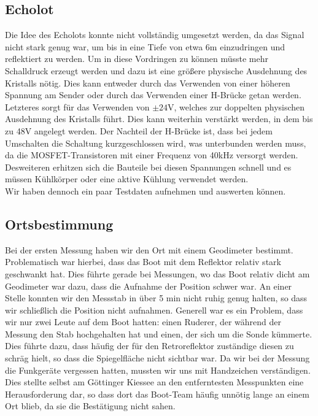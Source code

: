\documentclass[12pt,a4paper,titlepage,headinclude,bibtotoc]{scrartcl}
\numberwithin{equation}{subsection}
\begin{document}
\subsection{Echolot}
Die Idee des Echolots konnte nicht vollständig umgesetzt werden, da das Signal nicht stark genug war, um bis in eine Tiefe von etwa 6\si{\meter} einzudringen und reflektiert zu werden.
Um in diese Vordringen zu können müsste mehr Schalldruck erzeugt werden und dazu ist eine größere physische Ausdehnung des Kristalls nötig.
Dies kann entweder durch das Verwenden von einer höheren Spannung am Sender oder durch das Verwenden einer H-Brücke getan werden.
Letzteres sorgt für das Verwenden von $\pm24\si{\volt}$, welches zur doppelten physischen Ausdehnung des Kristalls führt.
Dies kann weiterhin verstärkt werden, in dem bis zu 48\si{\volt} angelegt werden.
Der Nachteil der H-Brücke ist, dass bei jedem Umschalten die Schaltung kurzgeschlossen wird, was unterbunden werden muss, da die MOSFET-Transistoren mit einer Frequenz von 40\si{\kilo\hertz} versorgt werden.
Desweiteren erhitzen sich die Bauteile bei diesen Spannungen schnell und es müssen Kühlkörper oder eine aktive Kühlung verwendet werden.\\
Wir haben dennoch ein paar Testdaten aufnehmen und auswerten können.

\subsection{Ortsbestimmung}
Bei der ersten Messung haben wir den Ort mit einem Geodimeter bestimmt.
Problematisch war hierbei, dass das Boot mit dem Reflektor relativ stark geschwankt hat.
Dies führte gerade bei Messungen, wo das Boot relativ dicht am Geodimeter war dazu, dass die Aufnahme der Position schwer war.
An einer Stelle konnten wir den Messstab in über 5 min nicht ruhig genug halten, so dass wir schließlich die Position nicht aufnahmen.
Generell war es ein Problem, dass wir nur zwei Leute auf dem Boot hatten: einen Ruderer, der während der Messung den Stab hochgehalten hat und einen, der sich um die Sonde kümmerte.
Dies führte dazu, dass häufig der für den Retroreflektor zuständige diesen zu schräg hielt, so dass die Spiegelfläche nicht sichtbar war.
Da wir bei der Messung die Funkgeräte vergessen hatten, mussten wir uns mit Handzeichen verständigen.
Dies stellte selbst am Göttinger Kiessee an den entferntesten Messpunkten eine Herausforderung dar, so dass dort das Boot-Team häufig unnötig lange an einem Ort blieb, da sie die Bestätigung nicht sahen.
\end{document}

